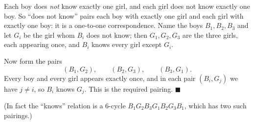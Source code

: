 Each boy does \emph{not} know exactly one girl, and each girl does not know exactly one boy. So ``does not know'' pairs each boy with exactly one girl and each girl with exactly one boy: it is a one-to-one correspondence. Name the boys $B_1,B_2,B_3$ and let $G_i$ be the girl whom $B_i$ does not know; then $G_1,G_2,G_3$ are the three girls, each appearing once, and $B_i$ knows every girl except $G_i$.

Now form the pairs
\[
(B_1,G_2),\qquad(B_2,G_3),\qquad(B_3,G_1).
\]
Every boy and every girl appears exactly once, and in each pair $(B_i,G_j)$ we have $j\ne i$, so $B_i$ knows $G_j$. This is the required pairing. $\blacksquare$

(In fact the ``knows'' relation is a $6$-cycle $B_1G_2B_3G_1B_2G_3B_1$, which has two such pairings.)
